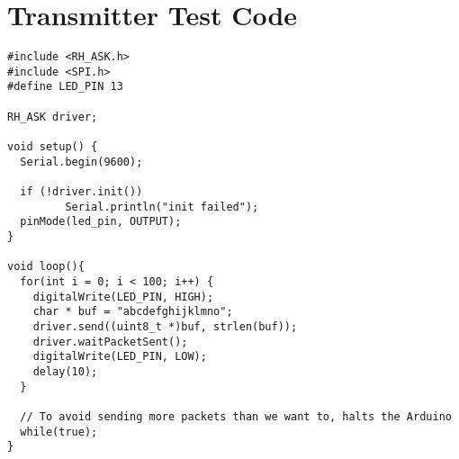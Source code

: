 \chapter{Transmitter Test Code}\label{chp:TransmitterTestCode}

\begin{lstlisting}[style=customc]
#include <RH_ASK.h>
#include <SPI.h>
#define LED_PIN 13

RH_ASK driver;

void setup() {
  Serial.begin(9600);

  if (!driver.init())
         Serial.println("init failed");
  pinMode(led_pin, OUTPUT);
}

void loop(){
  for(int i = 0; i < 100; i++) {
    digitalWrite(LED_PIN, HIGH);
    char * buf = "abcdefghijklmno";
    driver.send((uint8_t *)buf, strlen(buf));
    driver.waitPacketSent();
    digitalWrite(LED_PIN, LOW);
    delay(10);
  }

  // To avoid sending more packets than we want to, halts the Arduino
  while(true);
}


\end{lstlisting}